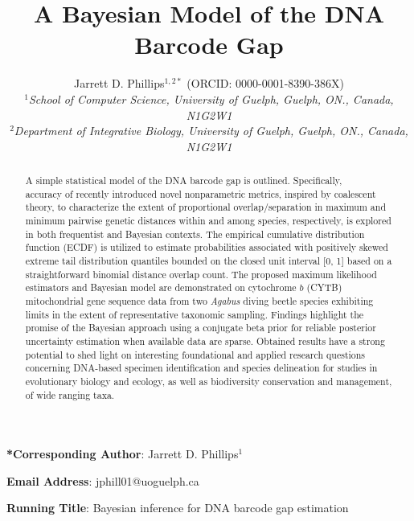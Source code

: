 \documentclass[12pt]{article}
\makeatletter
\renewcommand{\maketitle}{\bgroup\setlength{\parindent}{0pt}
\begin{flushleft}
\textbf{\@title}

  \@author
\end{flushleft}\egroup
}
\makeatother
\begin{document}
\linenumbers

\title{A Bayesian Model of the DNA Barcode Gap}

\author{Jarrett D. Phillips$^{1, 2*}$ (ORCID: 0000-0001-8390-386X)  \\
\textit{$^1$School of Computer Science, University of Guelph, Guelph, ON., Canada, N1G2W1} \\ \textit{$^2$Department of Integrative Biology, University of Guelph, Guelph, ON., Canada, N1G2W1} }

\date{}

\maketitle

\vspace{2mm}

\noindent \textbf{*Corresponding Author}: Jarrett D. Phillips$^{1}$

\noindent \textbf{Email Address}: jphill01@uoguelph.ca

\noindent \textbf{Running Title}: Bayesian inference for DNA barcode gap estimation

\newpage

\begin{abstract}

A simple statistical model of the DNA barcode gap is outlined. Specifically, \\ accuracy of recently introduced novel nonparametric metrics, inspired by coalescent theory, to characterize the extent of proportional overlap/separation in maximum and minimum pairwise genetic distances within and among species, respectively, is explored in both frequentist and Bayesian contexts. The empirical cumulative distribution function (ECDF) is utilized to estimate probabilities associated with positively skewed extreme tail distribution quantiles bounded on the closed unit interval [0, 1] based on a straightforward binomial distance overlap count. The proposed maximum likelihood estimators and Bayesian model are demonstrated on cytochrome $b$ (CYTB) \\ mitochondrial gene sequence data from two \textit{Agabus} diving beetle species exhibiting limits in the extent of representative taxonomic sampling. Findings highlight the promise of the Bayesian approach using a conjugate beta prior for reliable posterior uncertainty estimation when available data are sparse. Obtained results have a strong potential to shed light on  interesting foundational and applied research questions \\ concerning DNA-based specimen identification and species delineation for studies in evolutionary biology and ecology, as well as biodiversity conservation and management, of wide ranging taxa.

\end{abstract}
\end{document}
